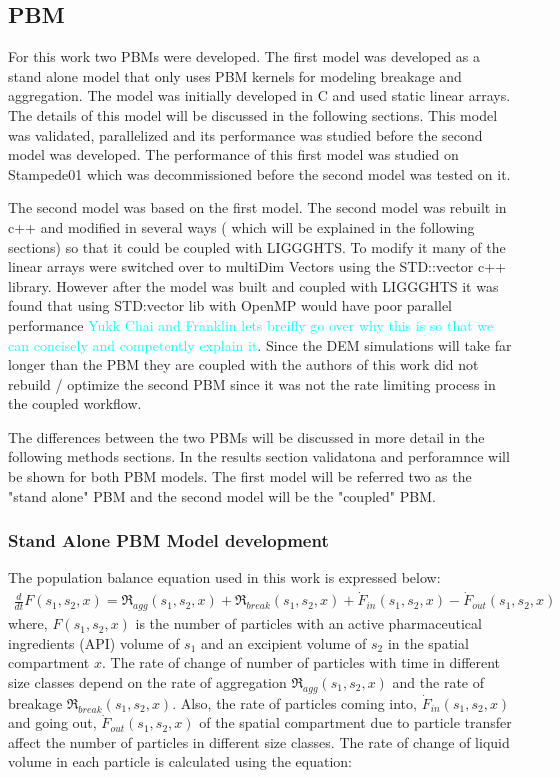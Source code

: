 \documentclass[preprint,11pt,authoryear]{elsarticle}
\begin{document}
\subsection{PBM}
\label{sec:pbm_model}
        For this work two PBMs were developed. The first model was developed as a stand alone model that only uses PBM kernels for modeling breakage and aggregation. The model was initially developed in C  and used static linear arrays. The details of this model will be discussed in the following sections. This model was validated, parallelized and its performance was studied before the second model was developed. The performance of this first model was studied on Stampede01 which was decommissioned before the second model was tested on it.

        The second model was based on the first model. The second model was rebuilt in c++ and modified in several ways ( which will be explained in the following sections) so that it could be coupled with LIGGGHTS. To modify it many of the linear arrays were switched over to multiDim Vectors using the STD::vector c++ library. However after the model was built and coupled with LIGGGHTS it was found that using STD:vector lib with OpenMP would have poor parallel performance \textcolor{cyan}{Yukk Chai and Franklin lets breifly go over why this is so that we can concisely and competently explain it}. Since the DEM simulations will take far longer than the PBM they are coupled with the authors of this work did not rebuild / optimize the second PBM since it was not the rate limiting process in the coupled workflow.

        The differences between the two PBMs will be discussed in more detail in the following methods sections. In the results section validatona and perforamnce will be shown for both PBM models. The first model will be referred two as the "stand alone" PBM and the second model will be the "coupled" PBM.


\subsubsection{Stand Alone PBM Model development}
 The population balance equation used in this work is expressed below:
\begin{align}
\frac{d}{dt}F(s_1,s_2,x)=\Re_{agg}(s_1,s_2,x)+\Re_{break}(s_1,s_2,x)+\dot{F}_{in}(s_1,s_2,x)-\dot{F}_{out}(s_1,s_2,x)
\label{eqn:mthds_pbm_overall} 
\end{align}
where, $F(s_1,s_2,x)$ is the number of particles with an active pharmaceutical ingredients (API) volume of $s_1$ and an excipient
volume of $s_2$ in the spatial compartment $x$. The rate of change of number of particles with time
in different size classes depend on the rate of aggregation $\Re_{agg}(s_1,s_2,x)$ and the rate of
breakage $\Re_{break}(s_1,s_2,x)$. Also, the rate of particles coming into, $\dot{F}_{in}(s_1,s_2,x)$ and
going out, $\dot{F}_{out}(s_1,s_2,x)$ of the spatial compartment due to particle transfer affect the number of
particles in different size classes.
The rate of change of liquid volume in each particle is calculated using the equation:
\end{document}
